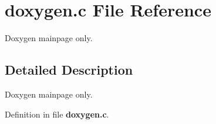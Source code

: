 \section{doxygen.\-c File Reference}
\label{doxygen_8c}


Doxygen mainpage only.  




\subsection{Detailed Description}
Doxygen mainpage only. 

Definition in file {\bf doxygen.\-c}.

